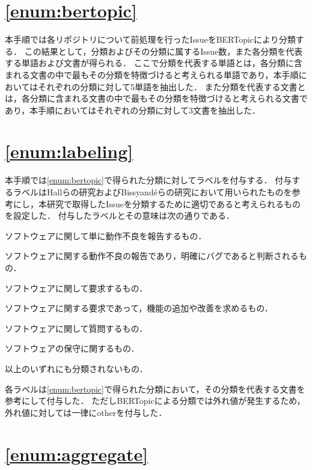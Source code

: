 \documentclass[main]{subfiles}
\begin{document}
\section{\ref{enum:bertopic}}

本手順では各リポジトリについて前処理を行ったIssueをBERTopicにより分類する．
この結果として，分類およびその分類に属するIssue数，また各分類を代表する単語および文書が得られる．
ここで分類を代表する単語とは，各分類に含まれる文書の中で最もその分類を特徴づけると考えられる単語であり，本手順においてはそれぞれの分類に対して5単語を抽出した．
また分類を代表する文書とは，各分類に含まれる文書の中で最もその分類を特徴づけると考えられる文書であり，本手順においてはそれぞれの分類に対して3文書を抽出した．

\section{\ref{enum:labeling}}

本手順では\ref{enum:bertopic}で得られた分類に対してラベルを付与する．
付与するラベルはHallらの研究およびBissyand{\'e}らの研究\cite{bissyande:2013}において用いられたものを参考にし，本研究で取得したIssueを分類するために適切であると考えられるものを設定した．
付与したラベルとその意味は次の通りである．

\begin{description}[labelwidth=6em, leftmargin=6em]
	\item[error] ソフトウェアに関して単に動作不良を報告するもの．
	\item[bug] ソフトウェアに関する動作不良の報告であり，明確にバグであると判断されるもの．
	\item[requirement] ソフトウェアに関して要求するもの．
	\item[improvement] ソフトウェアに関する要求であって，機能の追加や改善を求めるもの．
	\item[question] ソフトウェアに関して質問するもの．
	\item[maintenance] ソフトウェアの保守に関するもの．
	\item[other] 以上のいずれにも分類されないもの．
\end{description}

各ラベルは\ref{enum:bertopic}で得られた分類において，その分類を代表する文書を参考にして付与した．
ただしBERTopicによる分類では外れ値が発生するため，外れ値に対しては一律にotherを付与した．

\section{\ref{enum:aggregate}}
\end{document}
